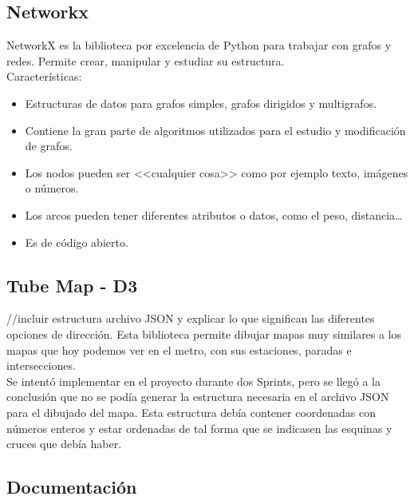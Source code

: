 \subsection{Networkx}
NetworkX es la biblioteca por excelencia de Python para trabajar con grafos y redes. Permite crear, manipular y estudiar su estructura.
\\
Características:
\begin{itemize}
	\item Estructuras de datos para grafos simples, grafos dirigidos y multigrafos.
	\item Contiene la gran parte de algoritmos utilizados para el estudio y modificación de grafos.
	\item Los nodos pueden ser <<cualquier cosa>> como por ejemplo texto, imágenes o números.
	\item Los arcos pueden tener diferentes atributos o datos, como el peso, distancia\dots
	\item Es de código abierto.
\end{itemize}


\subsection{Tube Map - D3}
//incluir estructura archivo JSON y explicar lo que significan las diferentes opciones de dirección.
Esta biblioteca permite dibujar mapas muy similares a los mapas que hoy podemos ver en el metro, con sus estaciones, paradas e intersecciones.
\\
Se intentó implementar en el proyecto durante dos Sprints, pero se llegó a la conclusión que no se podía generar la estructura necesaria en el archivo JSON para el dibujado del mapa. Esta estructura debía contener coordenadas con números enteros y estar ordenadas de tal forma que se indicasen las esquinas y cruces que debía haber.


\subsection{Documentación}



